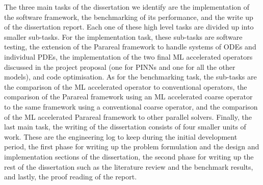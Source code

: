 \documentclass{article}
\begin{document}
The three main tasks of the dissertation we identify are the implementation of the software framework, the benchmarking of its performance, and the write up of the dissertation report. Each one of these high level tasks are divided up into smaller sub-tasks. For the implementation task, these sub-tasks are software testing, the extension of the Parareal framework to handle systems of ODEs and individual PDEs, the implementation of the two final ML accelerated operators discussed in the project proposal (one for PINNs and one for all the other models), and code optimisation. As for the benchmarking task, the sub-tasks are the comparison of the ML accelerated operator to conventional operators, the comparison of the Parareal framework using an ML accelerated coarse operator to the same framework using a conventional coarse operator, and the comparison of the ML accelerated Parareal framework to other parallel solvers. Finally, the last main task, the writing of the dissertation consists of four smaller units of work. These are the engineering log to keep during the initial development period, the first phase for writing up the problem formulation and the design and implementation sections of the dissertation, the second phase for writing up the rest of the dissertation such as the literature review and the benchmark results, and lastly, the proof reading of the report.
\end{document}
